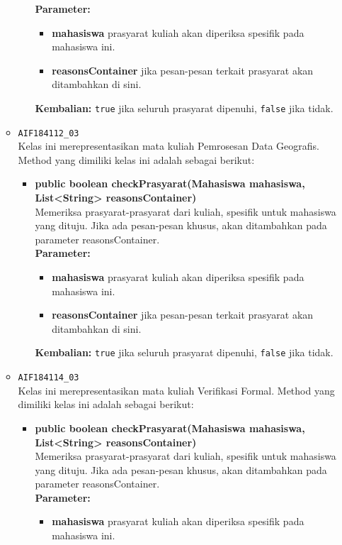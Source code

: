\begin{enumerate}
\begin{itemize}
\begin{itemize}
			\textbf{Parameter:}
			\begin{itemize}
				\item \textbf{mahasiswa} prasyarat kuliah akan diperiksa spesifik pada mahasiswa ini.
				\item \textbf{reasonsContainer} jika pesan-pesan terkait prasyarat akan ditambahkan di sini.
			\end{itemize}
			\textbf{Kembalian:} \texttt{true} jika seluruh prasyarat dipenuhi, \texttt{false} jika tidak.
		\end{itemize}
		\item \texttt{AIF184112\_03} \\
		Kelas ini merepresentasikan mata kuliah Pemrosesan Data Geografis. Method yang dimiliki kelas ini adalah sebagai berikut: 
		\begin{itemize}
			\item \textbf{public boolean checkPrasyarat(Mahasiswa mahasiswa, List<String> reasonsContainer)}\\
			Memeriksa prasyarat-prasyarat dari kuliah, spesifik untuk mahasiswa yang dituju. Jika ada pesan-pesan khusus, akan ditambahkan pada parameter reasonsContainer.\\
			\textbf{Parameter:}
			\begin{itemize}
				\item \textbf{mahasiswa} prasyarat kuliah akan diperiksa spesifik pada mahasiswa ini.
				\item \textbf{reasonsContainer} jika pesan-pesan terkait prasyarat akan ditambahkan di sini.
			\end{itemize}
			\textbf{Kembalian:} \texttt{true} jika seluruh prasyarat dipenuhi, \texttt{false} jika tidak.
		\end{itemize}
		\item \texttt{AIF184114\_03} \\
		Kelas ini merepresentasikan mata kuliah Verifikasi Formal. Method yang dimiliki kelas ini adalah sebagai berikut: 
		\begin{itemize}
			\item \textbf{public boolean checkPrasyarat(Mahasiswa mahasiswa, List<String> reasonsContainer)}\\
			Memeriksa prasyarat-prasyarat dari kuliah, spesifik untuk mahasiswa yang dituju. Jika ada pesan-pesan khusus, akan ditambahkan pada parameter reasonsContainer.\\
			\textbf{Parameter:}
			\begin{itemize}
				\item \textbf{mahasiswa} prasyarat kuliah akan diperiksa spesifik pada mahasiswa ini.

\end{itemize}
\end{itemize}
\end{itemize}
\end{enumerate}

